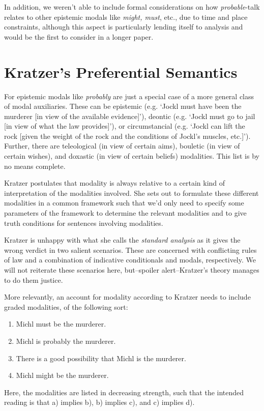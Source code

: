 \documentclass{article}
\theoremstyle{definition}
\begin{document}
In addition, we weren't able to include formal considerations on how \emph{probable}-talk relates to other epistemic modals like \emph{might, must}, etc., due to time and place constraints, although this aspect is particularly lending itself to analysis and would be the first to consider in a longer paper.

\section{Kratzer's Preferential Semantics}

For \textcite{kratzer91_modal} epistemic modals like \emph{probably} are just a special case of a more general class of modal auxiliaries.
These can be epistemic (e.g. `Jockl must have been the murderer [in view of the available evidence]'), deontic (e.g. `Jockl must go to jail [in view of what the law provides]'), or circumstancial (e.g. `Jockl can lift the rock [given the weight of the rock and the conditions of Jockl's muscles, etc.]').
Further, there are teleological (in view of certain aims), bouletic (in view of certain wishes), and doxastic (in view of certain beliefs) modalities.
This list is by no means complete.

Kratzer postulates that modality is always relative to a certain kind of interpretation of the modalities involved.
She sets out to formulate these different modalities in a common framework such that we'd only need to specify some parameters of the framework to determine the relevant modalities and to give truth conditions for sentences involving modalities.

Kratzer is unhappy with what she calls the \emph{standard analysis} as it gives the wrong verdict in two salient scenarios.
These are concerned with conflicting rules of law and a combination of indicative conditionals and modals, respectively.
We will not reiterate these scenarios here, but--spoiler alert--Kratzer's theory manages to do them justice.

More relevantly, an account for modality according to Kratzer needs to include graded modalities, of the following sort:
\begin{enumerate}[nosep,label=\alph*)]
  \item Michl must be the murderer.
  \item Michl is probably the murderer.
  \item There is a good possibility that Michl is the murderer.
  \item Michl might be the murderer.
\end{enumerate}
Here, the modalities are listed in decreasing strength, such that the intended reading is that a) implies b), b) implies c), and c) implies d).
\end{document}
